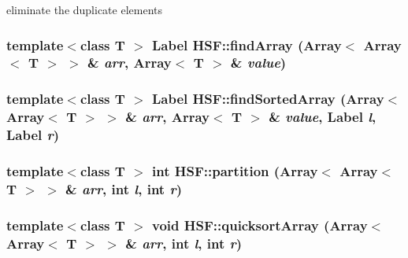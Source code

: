 eliminate the duplicate elements \hypertarget{namespaceHSF_a32f4c431a06856fabf4c7daf5631999b}{
\subsubsection[{findArray}]{\setlength{\rightskip}{0pt plus 5cm}template$<$class T $>$ {\bf Label} HSF::findArray (Array$<$ Array$<$ T $>$ $>$ \& {\em arr}, \/  Array$<$ T $>$ \& {\em value})}}
\label{namespaceHSF_a32f4c431a06856fabf4c7daf5631999b}
\hypertarget{namespaceHSF_ae869d0d290a3d2581e48dc9a92e715bd}{
\subsubsection[{findSortedArray}]{\setlength{\rightskip}{0pt plus 5cm}template$<$class T $>$ {\bf Label} HSF::findSortedArray (Array$<$ Array$<$ T $>$ $>$ \& {\em arr}, \/  Array$<$ T $>$ \& {\em value}, \/  Label {\em l}, \/  Label {\em r})}}
\label{namespaceHSF_ae869d0d290a3d2581e48dc9a92e715bd}
\hypertarget{namespaceHSF_a23a03c0df9db8be9c1e6459ca665c05b}{
\subsubsection[{partition}]{\setlength{\rightskip}{0pt plus 5cm}template$<$class T $>$ int HSF::partition (Array$<$ Array$<$ T $>$ $>$ \& {\em arr}, \/  int {\em l}, \/  int {\em r})}}
\label{namespaceHSF_a23a03c0df9db8be9c1e6459ca665c05b}
\hypertarget{namespaceHSF_a6b9d255d6786f77b964d5963b79726c4}{
\subsubsection[{quicksortArray}]{\setlength{\rightskip}{0pt plus 5cm}template$<$class T $>$ void HSF::quicksortArray (Array$<$ Array$<$ T $>$ $>$ \& {\em arr}, \/  int {\em l}, \/  int {\em r})}}
